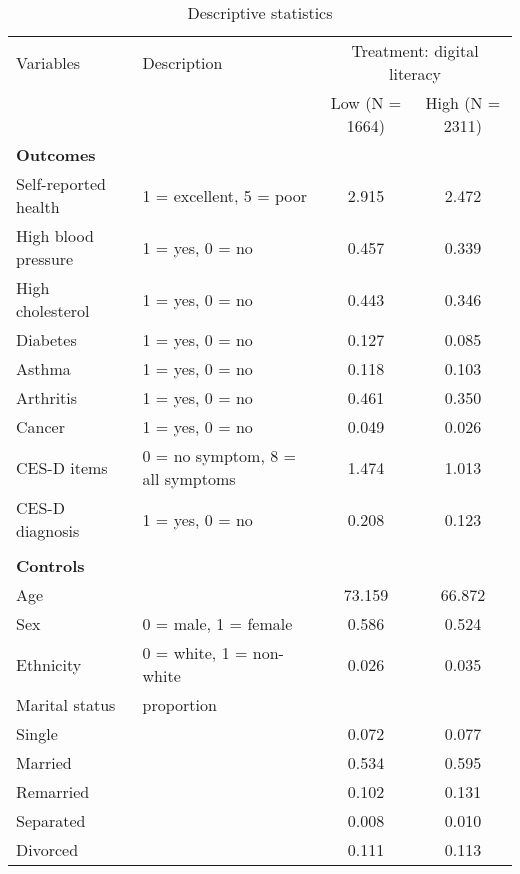 \documentclass[12pt]{article}
\begin{document}
    \begin{sidewaystable}[h!]
        \centering
        \caption{Descriptive statistics}
        \label{tab:desc_stats_q1}
        \begin{tabular}{llcc}
            \toprule
            Variables & Description & \multicolumn{2}{c}{Treatment: digital literacy} \\
            & & Low (N = 1664) & High (N = 2311) \\
            \midrule
            \textbf{Outcomes} & & & \\
            Self-reported health & 1 = excellent, 5 = poor & 2.915 & 2.472 \\
            High blood pressure & 1 = yes, 0 = no & 0.457 & 0.339 \\
            High cholesterol & 1 = yes, 0 = no & 0.443 & 0.346 \\
            Diabetes & 1 = yes, 0 = no & 0.127 & 0.085 \\
            Asthma & 1 = yes, 0 = no & 0.118 & 0.103 \\
            Arthritis & 1 = yes, 0 = no & 0.461 & 0.350 \\
            Cancer & 1 = yes, 0 = no & 0.049 & 0.026 \\
            CES-D items & 0 = no symptom, 8 = all symptoms & 1.474 & 1.013 \\
            CES-D diagnosis & 1 = yes, 0 = no & 0.208 & 0.123 \\
            & & & \\
            \textbf{Controls} & & & \\
            Age &  & 73.159 & 66.872 \\
            Sex & 0 = male, 1 = female & 0.586 & 0.524 \\
            Ethnicity & 0 = white, 1 = non-white & 0.026 & 0.035 \\
            Marital status & proportion & & \\
            \hspace{0.5cm} Single &  & 0.072 & 0.077 \\
            \hspace{0.5cm} Married &  & 0.534 & 0.595 \\
            \hspace{0.5cm} Remarried &  & 0.102 & 0.131 \\
            \hspace{0.5cm} Separated &  & 0.008 & 0.010 \\
            \hspace{0.5cm} Divorced &  & 0.111 & 0.113 \\

\end{tabular}
\end{sidewaystable}
\end{document}
